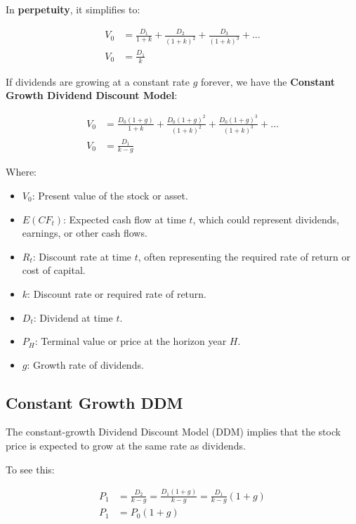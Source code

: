 \documentclass[
]{book}
\providecommand{\tightlist}{%
  \setlength{\itemsep}{0pt}\setlength{\parskip}{0pt}}
\begin{document}
In \textbf{perpetuity}, it simplifies to:

\[
\begin{align*}
V_0 &= \frac{D_1}{1+k} + \frac{D_2}{(1+k)^2} + \frac{D_3}{(1+k)^3} + \ldots \\
V_0 &= \frac{D_1}{k}
\end{align*}
\]

If dividends are growing at a constant rate \(g\) forever, we have the
\textbf{Constant Growth Dividend Discount Model}:

\[
\begin{align*}
V_0 &= \frac{D_0 (1+g)}{1+k} + \frac{D_0 (1+g)^2}{(1+k)^2} + \frac{D_0 (1+g)^3}{(1+k)^3} + \ldots \\
V_0 &= \frac{D_1}{k-g}
\end{align*}
\]

Where:

\begin{itemize}
\tightlist
\item
  \(V_0\): Present value of the stock or asset.
\item
  \(E(CF_t)\): Expected cash flow at time \(t\), which could represent
  dividends, earnings, or other cash flows.
\item
  \(R_t\): Discount rate at time \(t\), often representing the required
  rate of return or cost of capital.
\item
  \(k\): Discount rate or required rate of return.
\item
  \(D_t\): Dividend at time \(t\).
\item
  \(P_H\): Terminal value or price at the horizon year \(H\).
\item
  \(g\): Growth rate of dividends.
\end{itemize}

\hypertarget{constant-growth-ddm}{%
\subsection{Constant Growth DDM}\label{constant-growth-ddm}}

The constant-growth Dividend Discount Model (DDM) implies that the stock
price is expected to grow at the same rate as dividends.

To see this:

\[
\begin{align*}
P_1 &= \frac{D_2}{k - g} 
    = \frac{D_1 (1 + g)}{k - g} 
    = \frac{D_1}{k - g} (1 + g) \\
P_1     &= P_0 (1 + g)
\end{align*}
\]
\end{document}
